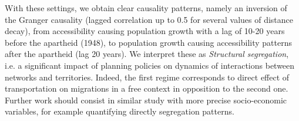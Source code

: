 \documentclass[11pt]{article}
\begin{document}
  With these settings, we obtain clear causality patterns, namely an inversion of the Granger causality (lagged correlation up to 0.5 for several values of distance decay), from accessibility causing population growth with a lag of 10-20 years before the apartheid (1948), to population growth causing accessibility patterns after the apartheid (lag 20 years). We interpret these as \emph{Structural segregation}, i.e. a significant impact of planning policies on dynamics of interactions between networks and territories. Indeed, the first regime corresponds to direct effect of transportation on migrations in a free context in opposition to the second one. Further work should consist in similar study with more precise socio-economic variables, for example quantifying directly segregation patterns.











\end{document}

